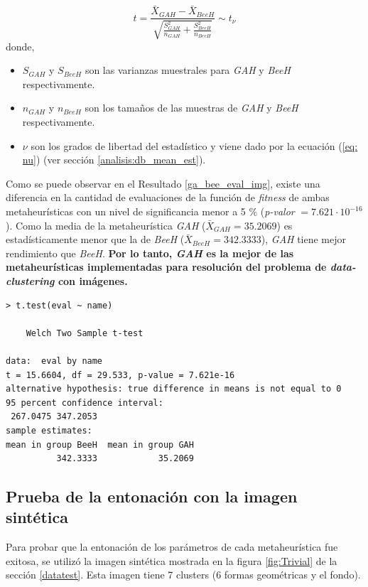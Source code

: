 \begin{equation}
    t = \displaystyle\frac{\bar{X}_{GAH} - \bar{X}_{BeeH}}{\sqrt{\frac{S_{GAH}^2}{n_{GAH}} + \frac{S_{BeeH}^2}{n_{BeeH}}}} \sim t_{\nu}
\end{equation}
donde,
\begin{itemize}
    \item $S_{GAH}$ y $S_{BeeH}$ son las varianzas muestrales para \emph{GAH} y
\emph{BeeH} respectivamente.
    \item $n_{GAH}$ y $n_{BeeH}$ son los tamaños de las muestras de \emph{GAH} y
\emph{BeeH} respectivamente.
    \item $\nu$ son los grados de libertad del estadístico y viene dado por la
          ecuación (\ref{eq: nu}) (ver sección \ref{analisis:db_mean_est}).
\end{itemize}

    Como se puede observar en el Resultado \ref{ga_bee_eval_img}, existe una
diferencia en la cantidad de evaluaciones de la función de \emph{fitness} de
ambas metaheurísticas con un nivel de significancia menor a 5 \%
(\emph{p-valor} $= 7.621 \cdot 10^{-16}$). Como la media de la metaheurística \emph{GAH}
($\bar{X}_{GAH} = 35.2069$) es estadísticamente menor que la de \emph{BeeH}
($\bar{X}_{BeeH} = 342.3333$), \emph{GAH} tiene mejor rendimiento que \emph{BeeH}.
\textbf{Por lo tanto, \emph{GAH} es la mejor de las metaheurísticas implementadas
para resolución del problema de \emph{data-clustering} con imágenes.}

\begin{lstlisting}[float=h!, caption={Diferencia de Medias: Evaluaciones de la función de \emph{fitness}}, label=ga_bee_eval_img]
> t.test(eval ~ name)

    Welch Two Sample t-test

data:  eval by name 
t = 15.6604, df = 29.533, p-value = 7.621e-16
alternative hypothesis: true difference in means is not equal to 0 
95 percent confidence interval:
 267.0475 347.2053 
sample estimates:
mean in group BeeH  mean in group GAH 
          342.3333            35.2069
\end{lstlisting}

\subsection{Prueba de la entonación con la imagen sintética}

    Para probar que la entonación de los parámetros de cada metaheurística fue
exitosa, se utilizó la imagen sintética mostrada en la figura \ref{fig:Trivial}
de la sección \ref{datatest}. Esta imagen tiene 7 clusters (6 formas geométricas
y el fondo).

